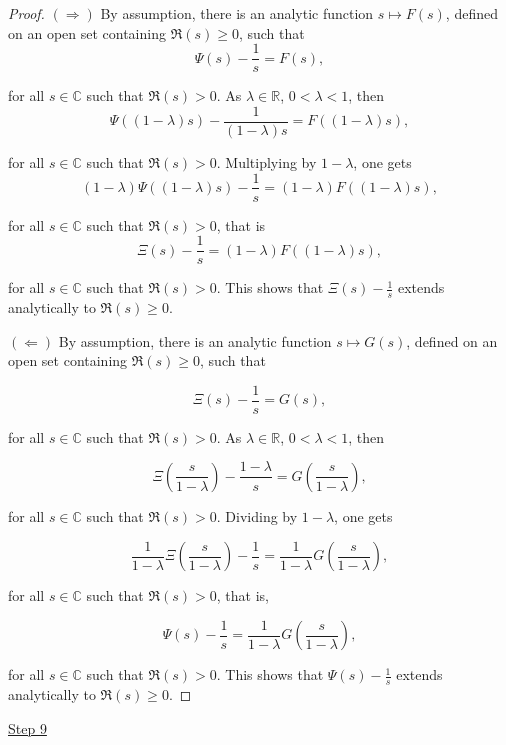 \documentclass[11pt]{amsart}
\numberwithin{equation}{section}
\newcommand{\R}{\mathbb{R}}
\newcommand{\C}{\mathbb{C}}
\newcommand{\difrac}{\displaystyle \frac}
\begin{document}
\begin{proof} $(\Rightarrow)$ By assumption, there is an analytic function $s \mapsto F(s)$, defined on an open set containing $\Re(s) \geq 0$, such that $$\Psi(s) - \difrac{1}{s} = F(s),$$

\noindent for all $s \in \C$ such that $\Re(s) > 0$. As $\lambda \in \R$, $0 < \lambda < 1$, then $$\Psi((1 - \lambda)s) - \difrac{1}{(1 - \lambda)s} = F((1 - \lambda)s),$$

\noindent for all $s \in \C$ such that $\Re(s) > 0$. Multiplying by $1 - \lambda$, one gets $$(1 - \lambda)\Psi((1 - \lambda)s) - \difrac{1}{s} = (1 - \lambda)F((1 - \lambda)s),$$

\noindent for all $s \in \C$ such that $\Re(s) > 0$, that is $$\Xi(s) - \difrac{1}{s} = (1 - \lambda)F((1 - \lambda)s),$$

\noindent for all $s \in \C$ such that $\Re(s) > 0$. This shows that $\Xi(s) - \difrac{1}{s}$ extends analytically to $\Re(s) \geq 0$.

\noindent $(\Leftarrow)$ By assumption, there is an analytic function $s \mapsto G(s)$, defined on an open set containing $\Re(s) \geq 0$, such that

$$\Xi(s) - \difrac{1}{s} = G(s),$$

\noindent for all $s \in \C$ such that $\Re(s) > 0$. As $\lambda \in \R$, $0 < \lambda < 1$, then

$$\Xi\left(\difrac{s}{1 - \lambda}\right) - \difrac{1 - \lambda}{s} = G\left(\difrac{s}{1 - \lambda}\right),$$

\noindent for all $s \in \C$ such that $\Re(s) > 0$. Dividing by $1 - \lambda$, one gets

$$\difrac{1}{1 - \lambda} \Xi\left(\difrac{s}{1 - \lambda}\right) - \difrac{1}{s} = \difrac{1}{1 - \lambda}G\left(\difrac{s}{1 - \lambda}\right),$$

\noindent for all $s \in \C$ such that $\Re(s) > 0$, that is,

$$\Psi(s) - \difrac{1}{s} = \difrac{1}{1 - \lambda}G\left(\difrac{s}{1 - \lambda}\right),$$

\noindent for all $s \in \C$ such that $\Re(s) > 0$. This shows that $\Psi(s) - \difrac{1}{s}$ extends analytically to $\Re(s) \geq 0$. \end{proof}

\vspace{5mm} \begin{center} \underline{Step 9} \end{center}
\end{document}
